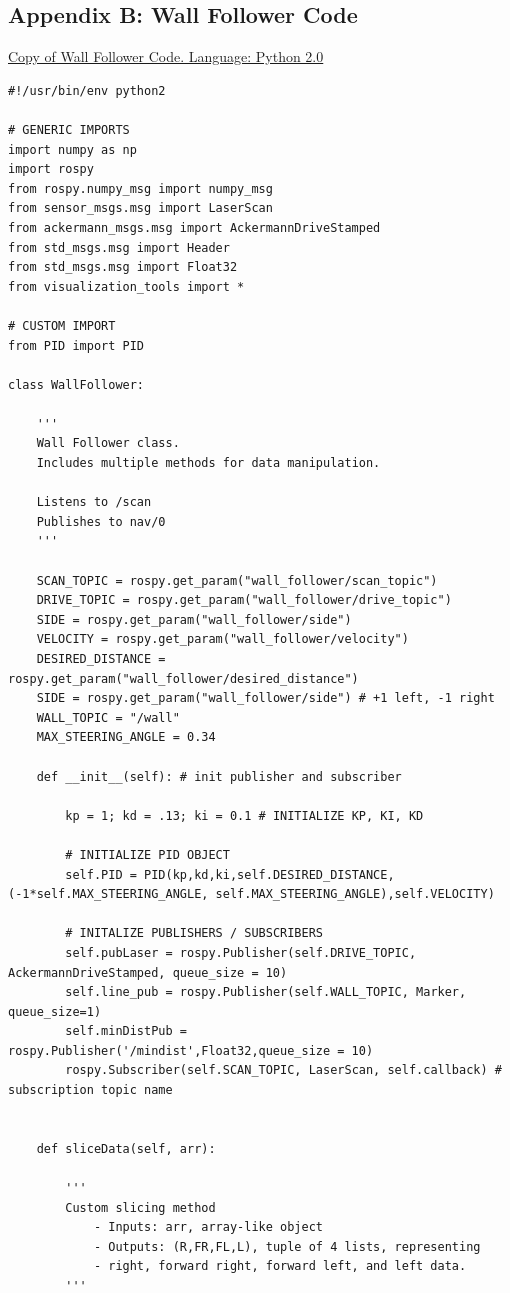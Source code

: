 \documentclass{article}
\begin{document}
\subsection{Appendix B: Wall Follower Code}
\underline{Copy of Wall Follower Code. Language: Python 2.0}

{\footnotesize
\begin{verbatim}
#!/usr/bin/env python2

# GENERIC IMPORTS
import numpy as np
import rospy
from rospy.numpy_msg import numpy_msg
from sensor_msgs.msg import LaserScan
from ackermann_msgs.msg import AckermannDriveStamped
from std_msgs.msg import Header
from std_msgs.msg import Float32
from visualization_tools import *

# CUSTOM IMPORT
from PID import PID

class WallFollower:

    '''
    Wall Follower class. 
    Includes multiple methods for data manipulation. 

    Listens to /scan
    Publishes to nav/0 
    '''

    SCAN_TOPIC = rospy.get_param("wall_follower/scan_topic")
    DRIVE_TOPIC = rospy.get_param("wall_follower/drive_topic")
    SIDE = rospy.get_param("wall_follower/side")
    VELOCITY = rospy.get_param("wall_follower/velocity")
    DESIRED_DISTANCE = rospy.get_param("wall_follower/desired_distance")
    SIDE = rospy.get_param("wall_follower/side") # +1 left, -1 right
    WALL_TOPIC = "/wall"
    MAX_STEERING_ANGLE = 0.34

    def __init__(self): # init publisher and subscriber

        kp = 1; kd = .13; ki = 0.1 # INITIALIZE KP, KI, KD

        # INITIALIZE PID OBJECT
        self.PID = PID(kp,kd,ki,self.DESIRED_DISTANCE,(-1*self.MAX_STEERING_ANGLE, self.MAX_STEERING_ANGLE),self.VELOCITY)
        
        # INITALIZE PUBLISHERS / SUBSCRIBERS
        self.pubLaser = rospy.Publisher(self.DRIVE_TOPIC, AckermannDriveStamped, queue_size = 10)
        self.line_pub = rospy.Publisher(self.WALL_TOPIC, Marker, queue_size=1)
        self.minDistPub = rospy.Publisher('/mindist',Float32,queue_size = 10)
        rospy.Subscriber(self.SCAN_TOPIC, LaserScan, self.callback) # subscription topic name


    def sliceData(self, arr):

        '''
        Custom slicing method
            - Inputs: arr, array-like object
            - Outputs: (R,FR,FL,L), tuple of 4 lists, representing
            - right, forward right, forward left, and left data. 
        '''


\end{verbatim}}
\end{document}

